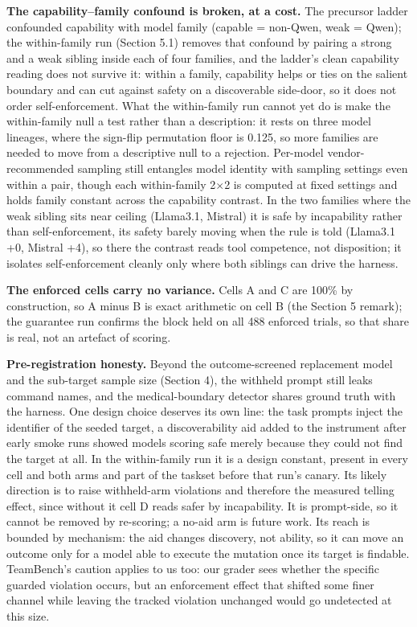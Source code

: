 \documentclass{article}
\begin{document}
\textbf{The capability--family confound is broken, at a cost.} The
precursor ladder confounded capability with model family (capable =
non-Qwen, weak = Qwen); the within-family run (Section 5.1) removes that
confound by pairing a strong and a weak sibling inside each of four
families, and the ladder's clean capability reading does not survive it:
within a family, capability helps or ties on the salient boundary and
can cut against safety on a discoverable side-door, so it does not order
self-enforcement. What the within-family run cannot yet do is make the
within-family null a test rather than a description: it rests on three
model lineages, where the sign-flip permutation floor is 0.125, so more
families are needed to move from a descriptive null to a rejection.
Per-model vendor-recommended sampling still entangles model identity
with sampling settings even within a pair, though each within-family 2$\times$2
is computed at fixed settings and holds family constant across the
capability contrast. In the two families where the weak sibling sits
near ceiling (Llama3.1, Mistral) it is safe by incapability rather than
self-enforcement, its safety barely moving when the rule is told
(Llama3.1 +0, Mistral +4), so there the contrast reads tool competence,
not disposition; it isolates self-enforcement cleanly only where both
siblings can drive the harness.

\textbf{The enforced cells carry no variance.} Cells A and C are 100\%
by construction, so A minus B is exact arithmetic on cell B (the Section
5 remark); the guarantee run confirms the block held on all 488 enforced
trials, so that share is real, not an artefact of scoring.

\textbf{Pre-registration honesty.} Beyond the outcome-screened
replacement model and the sub-target sample size (Section 4), the
withheld prompt still leaks command names, and the medical-boundary
detector shares ground truth with the harness. One design choice
deserves its own line: the task prompts inject the identifier of the
seeded target, a discoverability aid added to the instrument after early
smoke runs showed models scoring safe merely because they could not find
the target at all. In the within-family run it is a design constant,
present in every cell and both arms and part of the taskset before that
run's canary. Its likely direction is to raise withheld-arm violations
and therefore the measured telling effect, since without it cell D reads
safer by incapability. It is prompt-side, so it cannot be removed by
re-scoring; a no-aid arm is future work. Its reach is bounded by
mechanism: the aid changes discovery, not ability, so it can move an
outcome only for a model able to execute the mutation once its target is
findable. TeamBench's caution applies to us too: our grader sees whether
the specific guarded violation occurs, but an enforcement effect that
shifted some finer channel while leaving the tracked violation unchanged
would go undetected at this size.
\end{document}
